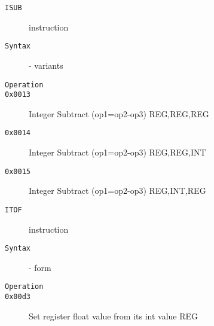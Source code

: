 \begin{description}
\item[\texttt{ISUB}] instruction\\
\item[\texttt{Syntax}] - variants\\

\item[\texttt{Operation}]
\item[\texttt{}]
\item[\texttt{0x0013}] Integer Subtract (op1=op2-op3)  {REG,REG,REG}       \\
\item[\texttt{0x0014}] Integer Subtract (op1=op2-op3)  {REG,REG,INT}       \\
\item[\texttt{0x0015}] Integer Subtract (op1=op2-op3)  {REG,INT,REG}       \\
\end{description}
\clearpage
\begin{description}
\item[\texttt{ITOF}] instruction\\
\item[\texttt{Syntax}] - form \\

\item[\texttt{Operation}]
\item[\texttt{}]
\item[\texttt{0x00d3}] Set register float value from its int value  {REG}               \\
\end{description}
\clearpage
